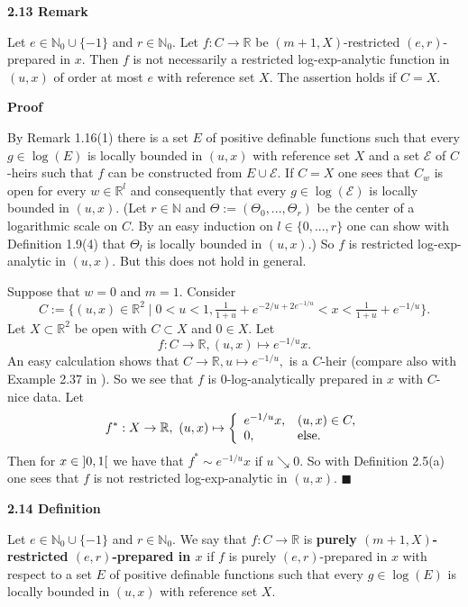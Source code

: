 \documentclass[12pt]{article}
\def\vs{\vspace}
\begin{document}
\vs{0.5cm}
{\bf2.13 Remark}

\vs{0.1cm}
Let $e \in \mathbb{N}_0 \cup \{-1\}$ and $r \in \mathbb{N}_0$. Let $f:C \to \mathbb{R}$ be $(m+1,X)$-restricted $(e,r)$-prepared in $x$. Then $f$ is not necessarily a restricted log-exp-analytic function in $(u,x)$ of order at most $e$ with reference set $X$. The assertion holds if $C=X$. 

\vs{0.4cm}
{\bf Proof}

\vs{0.1cm}
By Remark 1.16(1) there is a set $E$ of positive definable functions such that every $g \in \log(E)$ is locally bounded in $(u,x)$ with reference set $X$ and a set $\mathcal{E}$ of $C$-heirs such that $f$ can be constructed from $E \cup \mathcal{E}$. If $C=X$ one sees that $C_w$ is open for every $w \in \mathbb{R}^l$ and consequently that every $g \in \log(\mathcal{E})$ is locally bounded in $(u,x)$. (Let $r \in \mathbb{N}$ and $\Theta:=(\Theta_0,...,\Theta_r)$ be the center of a logarithmic scale on $C$. By an easy induction on $l \in \{0,...,r\}$ one can show with Definition 1.9(4) that $\Theta_l$ is locally bounded in $(u,x)$.) So $f$ is restricted log-exp-analytic in $(u,x)$. But this does not hold in general.

\vs{0.4cm}
Suppose that $w=0$ and $m=1$. Consider
$$C:=\{(u,x) \in \mathbb{R}^2 \mid 0 < u < 1, \tfrac{1}{1+u}+e^{-2/u+2e^{-1/u}} < x < \tfrac{1}{1+u}+e^{-1/u}\}.$$
 Let $X \subset \mathbb{R}^2$ be open with $C \subset X$ and $0 \in X$. Let
$$f:C \to \mathbb{R}, (u,x) \mapsto e^{-1/u}x.$$
An easy calculation shows that $C \to \mathbb{R}, u \mapsto e^{-1/u},$ is a $C$-heir (compare also with Example 2.37 in \cite{10}). So we see that $f$ is $0$-log-analytically prepared in $x$ with $C$-nice data. Let
$$
f^*:X \to \mathbb{R}, \textnormal{ } (u,x) \mapsto 
\left\{\begin{array}{ll} e^{-1/u}x,& (u,x) \in C, \\
0,& \textnormal{else}. \end{array}\right.
$$
Then for $x \in \textnormal{} ]0,1[$ we have that $f^* \sim e^{-1/u}x$ if $u \searrow 0$. So with Definition 2.5(a) one sees that $f$ is not restricted log-exp-analytic in $(u,x)$.
\hfill$\blacksquare$

\vs{0.5cm}
{\bf2.14 Definition}

\vs{0.1cm}
Let $e \in \mathbb{N}_0 \cup \{-1\}$ and $r \in \mathbb{N}_0$. We say that $f:C \to \mathbb{R}$ is \textbf{purely $(m+1,X)$-restricted $(e,r)$-prepared in $x$} if $f$ is purely $(e,r)$-prepared in $x$ with respect to a set $E$ of positive definable functions such that every $g \in \log(E)$ is locally bounded in $(u,x)$ with reference set $X$.
\end{document}
